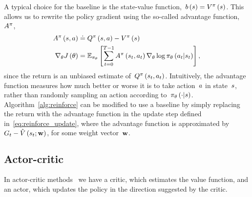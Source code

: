 A typical choice for the baseline is the state-value function,~${\baseline\left(\state\right)=\statevalue\policyscript\left(\state\right)}$. This allows us to rewrite the policy gradient using the so-called advantage function,~${A^{\pi}}$,
\begin{equation}
\begin{split}
	\advantage\policyscript\left(\state,\action\right)&\doteq\actionvalue\policyscript\left(\state,\action\right)-\statevalue\policyscript\left(\state\right) \\
	\nabla_{\policyparameter}\objective\left(\policyparameter\right)&=\mathbb{E}_{\policy_{\policyparameter}}\left[\sum_{\timestep=0}^{\horizon-1}\advantage\policyscript\left(\randomstate_{\timestep},\randomaction_{\timestep}\right)\nabla_{\policyparameter}\log\policy_{\policyparameter}\left(\randomaction_{\timestep}\middle\vert\randomstate_{\timestep}\right)\right],
\end{split}
\end{equation}
since the return is an unbiased estimate of~${Q^{\pi}\left(s_{t},a_{t}\right)}$. Intuitively, the advantage function measures how much better or worse it is to take action~${\action}$ in state~${\state}$, rather than randomly sampling an action according to~${\policy_{\policyparameter}\left(\cdot\middle\vert\state\right)}$. Algorithm~\ref{alg:reinforce} can be modified to use a baseline by simply replacing the return with the advantage function in the update step defined in~\eqref{eq:reinforce_update}, where the advantage function is approximated by~${G_{t}-\hat{V}\left(s_{t};\mathbf{w}\right)}$, for some weight vector~${\mathbf{w}}$.

\subsection{Actor-critic}
In actor-critic methods~\cite{barto1983} we have a critic, which estimates the value function, and an actor, which updates the policy in the direction suggested by the critic.

